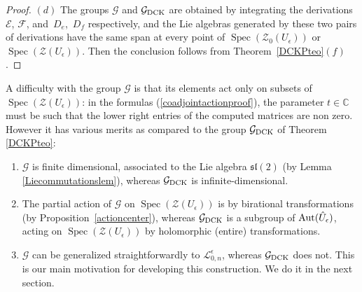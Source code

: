 \documentclass[pdftex]{sigma}%
\numberwithin{equation}{section}
\numberwithin{figure}{section}
\newcommand{\e}{\epsilon}
\newcommand{\mc}{\mathbb{C}}
\newcommand{\Ll}{{\mathcal L}}
\begin{document}
\begin{proof}
$(d)$ The groups $\mathcal{G}$ and $\mathcal{G}_{\rm DCK}$ are obtained by integrating the derivations ${\mathcal E}$, ${\mathcal F}$, and~$D_e$,~$D_f$ respectively, and the Lie algebras generated by these two pairs of derivations have the same span at every point of $\operatorname{Spec}(\mathcal{Z}_0(U_\epsilon))$ or $\operatorname{Spec}(\mathcal{Z}(U_\epsilon))$. Then the conclusion follows from Theorem~\ref{DCKPteo}$(f)$.\end{proof}

\begin{remk}\label{explanation}
A difficulty with the group $\mathcal{G}$ is that its elements act only on subsets of $\operatorname{Spec}(\mathcal{Z}(U_\epsilon))$: in the formulas (\ref{coadjointactionproof}), the parameter $t\in \mc$ must be such that the lower right entries of the computed matrices are non zero. However it has various merits as compared to the group $\mathcal{G}_{\rm DCK}$ of Theorem \ref{DCKPteo}:
\begin{enumerate}\itemsep=0pt

\item[$(i)$] $\mathcal{G}$ is finite dimensional, associated to the Lie algebra ${\mathfrak{sl}}(2)$ (by Lemma \ref{Liecommutationslem}), whereas $\mathcal{G}_{\rm DCK}$ is infinite-dimensional.

\item[$(ii)$] The partial action of $\mathcal{G}$ on $\operatorname{Spec}(\mathcal{Z}(U_\epsilon))$ is by birational transformations (by Proposition~\ref{actioncenter}), whereas $\mathcal{G}_{\rm DCK}$ is a subgroup of ${\rm Aut}(\hat U_\e)$, acting on $\operatorname{Spec}(\mathcal{Z}(U_\epsilon))$ by holomorphic (entire) transformations.

\item[$(iii)$] $\mathcal{G}$ can be generalized straightforwardly to $\Ll_{0,n}^\e$, whereas $\mathcal{G}_{\rm DCK}$ does not. This is our main motivation for developing this construction. We do it in the next section.

\end{enumerate}
\end{remk}
\end{document}
